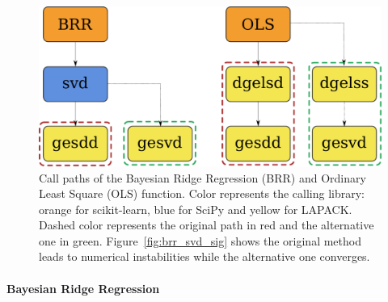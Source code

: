 \documentclass[11pt]{article}
\begin{document}


\begin{figure}
    \centering
    \includegraphics[width=0.5\linewidth]{figure/BRR/call_path.pdf}
    \caption{Call paths of the Bayesian Ridge Regression (BRR) and 
    Ordinary Least Square (OLS) function. Color represents the calling library:
    orange for scikit-learn, blue for SciPy and yellow for LAPACK.
    Dashed color represents the original path in red and the alternative one in green.
    Figure~\ref{fig:brr_svd_sig} shows the original method  leads to numerical instabilities while the alternative one converges.
    }
    \label{fig:call_path_brr}
\end{figure}

\paragraph{Bayesian Ridge Regression}
\end{document}
